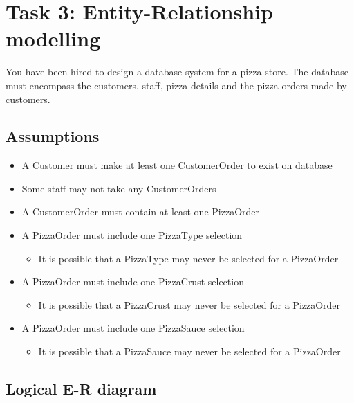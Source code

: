 \newpage
\section{Task 3: Entity-Relationship modelling}

You have been hired to design a database system for a pizza store. The database must encompass the customers, staff, pizza details and the pizza orders made by customers.

\subsection{Assumptions}

\begin{itemize}
\item A Customer must make at least one CustomerOrder to exist on database
\item Some staff may not take any CustomerOrders
\item A CustomerOrder must contain at least one PizzaOrder
\item A PizzaOrder must include one PizzaType selection
	\begin{itemize}
	\item It is possible that a PizzaType may never be selected for a PizzaOrder
	\end{itemize}
\item A PizzaOrder must include one PizzaCrust selection
	\begin{itemize}
	\item It is possible that a PizzaCrust may never be selected for a PizzaOrder
	\end{itemize}
\item A PizzaOrder must include one PizzaSauce selection
	\begin{itemize}
	\item It is possible that a PizzaSauce may never be selected for a PizzaOrder
	\end{itemize}
\end{itemize}

\subsection{Logical E-R diagram}

